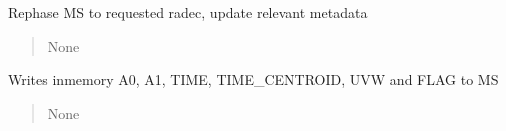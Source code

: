 \documentclass[letterpaper,10pt,english]{sphinxmanual}
\begin{document}
\begin{fulllineitems}
\begin{fulllineitems}
\begin{quote}
\begin{description}
\end{description}\end{quote}

\end{fulllineitems}


\begin{fulllineitems}
\label{\detokenize{api/killMS.Data:killMS.Data.ClassMS.ClassMS.RotateMS}}
\pysigstartsignatures
{}
\pysigstopsignatures
\sphinxAtStartPar
Rephase MS to requested radec, update relevant metadata
\begin{quote}\begin{description}
\sphinxAtStartPar
None

\end{description}\end{quote}

\end{fulllineitems}


\begin{fulllineitems}
\label{\detokenize{api/killMS.Data:killMS.Data.ClassMS.ClassMS.SaveAllDataStruct}}
\pysigstartsignatures
{}
\pysigstopsignatures
\sphinxAtStartPar
Writes in\sphinxhyphen{}memory A0, A1, TIME, TIME\_CENTROID, UVW and FLAG to MS
\begin{quote}\begin{description}
\sphinxAtStartPar
None

\end{description}\end{quote}

\end{fulllineitems}



\end{fulllineitems}
\end{document}
